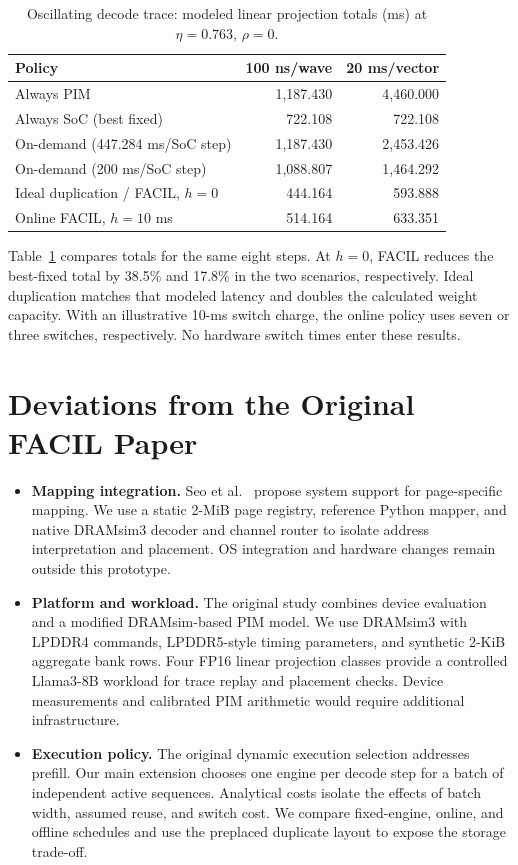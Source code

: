 \documentclass[conference,10pt]{IEEEtran}
\begin{document}
\begin{table}[t]
\caption{Oscillating decode trace: modeled linear projection totals
(ms) at $\eta=0.763$, $\rho=0$.}
\label{tab:decode-comparison}
\centering\scriptsize
\setlength{\tabcolsep}{3pt}
\begin{tabular}{@{}lrr@{}}
\toprule
Policy & 100 ns/wave & 20 ms/vector\\
\midrule
Always PIM & 1,187.430 & 4,460.000\\
Always SoC (best fixed) & 722.108 & 722.108\\
On-demand (447.284 ms/SoC step) & 1,187.430 & 2,453.426\\
On-demand (200 ms/SoC step) & 1,088.807 & 1,464.292\\
Ideal duplication / FACIL, $h=0$ & 444.164 & 593.888\\
Online FACIL, $h=10$ ms & 514.164 & 633.351\\
\bottomrule
\end{tabular}
\end{table}

Table~\ref{tab:decode-comparison} compares totals for the same eight
steps. At $h=0$, FACIL reduces the best-fixed total by 38.5\% and
17.8\% in the two scenarios, respectively. Ideal duplication
matches that modeled latency and doubles the calculated weight
capacity. With an illustrative 10-ms switch charge, the online
policy uses seven or three switches, respectively. No hardware
switch times enter these results.

\section{Deviations from the Original FACIL Paper}
\begin{itemize}
\item \textbf{Mapping integration.} Seo et al.~\cite{facil} propose
system support for page-specific mapping. We use a static 2-MiB page registry,
reference Python mapper, and native DRAMsim3 decoder and channel router
to isolate address interpretation and placement. OS integration and
hardware changes remain outside this prototype.
\item \textbf{Platform and workload.} The original study combines
device evaluation and a modified DRAMsim-based PIM model. We use
DRAMsim3 with LPDDR4 commands, LPDDR5-style timing parameters, and
synthetic 2-KiB aggregate bank rows. Four FP16 linear projection classes
provide a controlled Llama3-8B workload for trace replay and placement
checks. Device measurements and calibrated PIM arithmetic would require
additional infrastructure.
\item \textbf{Execution policy.} The original dynamic execution
selection addresses prefill. Our main extension chooses one engine per
decode step for a batch of independent active sequences. Analytical
costs isolate the effects of batch width, assumed reuse, and switch
cost. We compare fixed-engine, online, and offline schedules and use
the preplaced duplicate layout to expose the storage trade-off.
\end{itemize}
\end{document}
